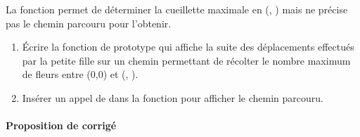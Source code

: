 \documentclass[a4paper, 11pt]{article}
\begin{document}
      La fonction  permet de déterminer la cueillette maximale en (, ) mais ne précise pas le chemin parcouru pour l'obtenir.

      \begin{enumerate}[resume]
      \item \'Ecrire la fonction de prototype 
      qui affiche la suite des déplacements effectués par la petite fille sur un chemin permettant de récolter le nombre maximum de fleurs entre (0,0) et (, ).
      \item Insérer un appel de  dans la fonction  pour afficher le chemin parcouru.
  \end{enumerate}

  \paragraph*{Proposition de corrigé}
\end{document}
